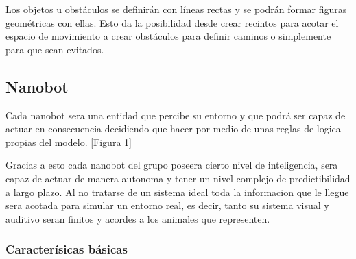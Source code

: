 Los objetos u obstáculos se definirán con líneas rectas y se podrán formar figuras geométricas con ellas.  Esto da la posibilidad desde crear recintos para acotar el espacio de movimiento a crear obstáculos para definir caminos o simplemente para que sean evitados.
 
\subsection{Nanobot}
\label{sec:nanobot}

Cada nanobot sera una entidad que percibe su entorno y que podrá ser capaz de actuar en consecuencia decidiendo que hacer por medio de unas reglas de logica propias del modelo. [Figura 1]

Gracias a esto cada nanobot del grupo poseera cierto nivel de inteligencia, sera capaz de actuar de manera autonoma y  tener un nivel complejo de predictibilidad  a largo plazo. Al no tratarse de un sistema ideal toda la informacion que le llegue sera acotada para simular un entorno real, es decir, tanto su sistema visual y auditivo seran finitos y acordes a los animales que representen.

\subsubsection{Caracterísicas básicas}
\label{sec:caracteristicas_basicas}


